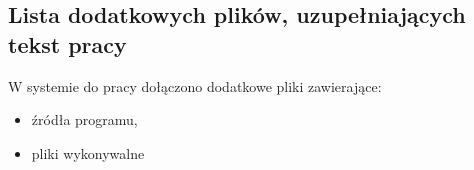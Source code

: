 \documentclass[a4paper,twoside,12pt]{book}
\begin{document}
\begin{appendices}
\chapter{Lista dodatkowych plików, uzupełniających tekst pracy} 


W systemie do pracy dołączono dodatkowe pliki zawierające:
\begin{itemize}
\item źródła programu,
\item pliki wykonywalne
\end{itemize}


\listoffigures
{}
\listoftables
{}

\end{appendices}
\end{document}
